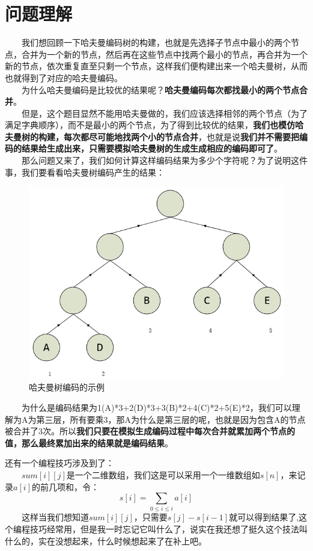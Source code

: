\documentclass[11pt]{ctexart}
\begin{document}
\section{问题理解}
\noindent　　我们想回顾一下哈夫曼编码树的构建，也就是先选择子节点中最小的两个节点，合并为一个新的节点，然后再在这些节点中找两个最小的节点，再合并为一个新的节点，依次重复直至只剩一个节点，这样我们便构建出来一个哈夫曼树，从而也就得到了对应的哈夫曼编码。\\
　　为什么哈夫曼编码是比较优的结果呢？\textbf{哈夫曼编码每次都找最小的两个节点合并}。\\
　　但是，这个题目显然不能用哈夫曼做的，我们应该选择相邻的两个节点（为了满足字典顺序），而不是最小的两个节点，为了得到比较优的结果，\textbf{我们也模仿哈夫曼树的构建，每次都尽可能地找两个小的节点合并}，也就是说\textbf{我们并不需要把编码的结果给生成出来，只需要模拟哈夫曼树的生成生成相应的编码即可了}。\\
　　那么问题又来了，我们如何计算这样编码结果为多少个字符呢？为了说明这件事，我们要看看哈夫曼树编码产生的结果：\\
\begin{figure}[H]
\centering
\includegraphics[scale=0.5]{haffmancode.png}
\caption{哈夫曼树编码的示例}
\end{figure}
\noindent　　为什么是编码结果为1(A)*3+2(D)*3+3(B)*2+4(C)*2+5(E)*2，我们可以理解为A为第三层，所有要乘3，那A为什么是第三层的呢，也就是因为包含A的节点被合并了3次。所以\textbf{我们只要在模拟生成编码过程中每次合并就累加两个节点的值，那么最终累加出来的结果就是编码结果}。

还有一个编程技巧涉及到了：\\
　　$sum[i][j]$是一个二维数组，我们这是可以采用一个一维数组如$s[n]$，来记录$a[i]$的前几项和，令：\\$$s[i] = \sum\limits_{0 \leqslant i \leqslant i}a[i]$$
　　这样当我们想知道$sum[i][j]$，只需要$s[j] - s[i-1]$就可以得到结果了,这个编程技巧经常用，但是我一时忘记它叫什么了，说实在我还想了挺久这个技法叫什么的，实在没想起来，什么时候想起来了在补上吧。\\
\end{document}
